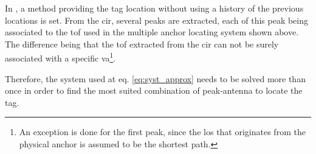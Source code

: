 In \cite{jespersen2018indoor}, a method providing the tag location without using a history of the previous locations is set. From the \gls{cir}, several peaks are extracted, each of this peak being associated to the \gls{tof} used in the multiple anchor locating system shown above. The difference being that the \gls{tof} extracted from the \gls{cir} can not be surely associated with a specific \gls{va}\footnote{An exception is done for the first peak, since the \gls{los} that originates from the physical anchor is assumed to be the shortest path.}. 
\vspace{2mm}

Therefore, the system used at eq. \ref{eq:syst_approx} needs to be solved more than once in order to find the most suited combination of peak-antenna to locate the tag.
